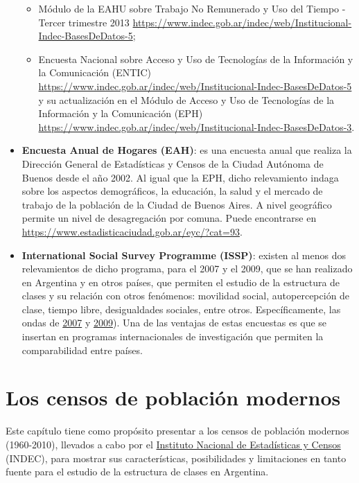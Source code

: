 \documentclass[
]{article}
\providecommand{\tightlist}{%
  \setlength{\itemsep}{0pt}\setlength{\parskip}{0pt}}
\begin{document}
\begin{itemize}
  \begin{itemize}
  \tightlist
  \item
    Módulo de la EAHU sobre Trabajo No Remunerado y Uso del Tiempo - Tercer trimestre 2013 \url{https://www.indec.gob.ar/indec/web/Institucional-Indec-BasesDeDatos-5};
  \item
    Encuesta Nacional sobre Acceso y Uso de Tecnologías de la Información y la Comunicación (ENTIC) \url{https://www.indec.gob.ar/indec/web/Institucional-Indec-BasesDeDatos-5} y su actualización en el Módulo de Acceso y Uso de Tecnologías de la Información y la Comunicación (EPH) \url{https://www.indec.gob.ar/indec/web/Institucional-Indec-BasesDeDatos-3}.
  \end{itemize}
\item
  \textbf{Encuesta Anual de Hogares (EAH)}: es una encuesta anual que realiza la Dirección General de Estadísticas y Censos de la Ciudad Autónoma de Buenos desde el año 2002. Al igual que la EPH, dicho relevamiento indaga sobre los aspectos demográficos, la educación, la salud y el mercado de trabajo de la población de la Ciudad de Buenos Aires. A nivel geográfico permite un nivel de desagregación por comuna. Puede encontrarse en \url{https://www.estadisticaciudad.gob.ar/eyc/?cat=93}.
\item
  \textbf{International Social Survey Programme (ISSP)}: existen al menos dos relevamientos de dicho programa, para el 2007 y el 2009, que se han realizado en Argentina y en otros países, que permiten el estudio de la estructura de clases y su relación con otros fenómenos: movilidad social, autopercepción de clase, tiempo libre, desigualdades sociales, entre otros. Específicamente, las ondas de \href{https://dbk.gesis.org/dbksearch/sdesc2.asp?no=4850\&search=issp\%202007\&search2=\&field=all\&field2=\&DB=e\&tab=0\&notabs=\&nf=1\&af=\&ll=10}{2007} y \href{https://dbk.gesis.org/dbksearch/sdesc2.asp?no=5400\&search=issp\%202009\&search2=\&field=all\&field2=\&DB=e\&tab=0\&notabs=\&nf=1\&af=\&ll=10}{2009}). Una de las ventajas de estas encuestas es que se insertan en programas internacionales de investigación que permiten la comparabilidad entre países.
\end{itemize}

\hypertarget{fuentes2}{%
\section{Los censos de población modernos}\label{fuentes2}}

Este capítulo tiene como propósito presentar a los censos de población modernos (1960-2010), llevados a cabo por el \href{https://www.indec.gob.ar}{Instituto Nacional de Estadísticas y Censos} (INDEC), para mostrar sus características, posibilidades y limitaciones en tanto fuente para el estudio de la estructura de clases en Argentina.
\end{document}
